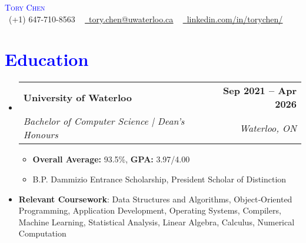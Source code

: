 \documentclass[letterpaper,11pt]{article}
\makeatletter
\newcommand{\resumeItem}[1]{
  \item\small{
    {#1 \vspace{-3pt}}
  }
}
\newcommand{\resumeSubheading}[4]{
  \vspace{-2pt}\item
    \begin{tabular*}{1.0\textwidth}[t]{l@{\extracolsep{\fill}}r}
      \textbf{#1} & \textbf{\small #2} \\
      \textit{\small#3} & \textit{\small #4} \\
    \end{tabular*}\vspace{-7pt}
}
\newcommand{\resumeSubItem}[1]{\resumeItem{#1}\vspace{-4pt}}
\newcommand{\resumeSubHeadingListStart}{\begin{itemize}[leftmargin=0.0in, label={}]}
\newcommand{\resumeSubHeadingListEnd}{\end{itemize}}
\makeatother
\begin{document}
\begin{center}
    \textcolor{Blue}{\Huge \scshape Tory Chen} \\ \vspace{1pt}
    \small \raisebox{-0.1\height}\faPhone\ (+1) 647-710-8563 ~ \href{mailto:tory.chen@uwaterloo.ca}{\raisebox{-0.2\height}\faEnvelope\  \underline{tory.chen@uwaterloo.ca}} ~ 
    \href{https://www.linkedin.com/in/torychen/}{\raisebox{-0.2\height}\faLinkedin\ \underline{linkedin.com/in/torychen/}}  ~
    \vspace{-8pt}
\end{center}


\section{\textcolor{Blue}{Education}}
  \resumeSubHeadingListStart
    \resumeSubheading
          {\textcolor{NavyBlue}{University of Waterloo}}{Sep 2021 -- Apr 2026}
      {Bachelor of Computer Science | Dean's Honours}{Waterloo, ON}
      \begin{itemize}
        \item\small \textbf{Overall Average:} 93.5\%, \textbf{GPA:} 3.97/4.00
        \item\small B.P. Dammizio Entrance Scholarship, President Scholar of Distinction
      \end{itemize}
  \resumeSubItem{}
    \textbf{\textcolor{NavyBlue}{Relevant Coursework}}{: Data Structures and Algorithms, Object‐Oriented Programming, Application Development, Operating Systems, Compilers, Machine Learning, Statistical Analysis, Linear Algebra, Calculus, Numerical Computation 
    } 
    \vspace{3pt}
  \resumeSubHeadingListEnd
\vspace{-22pt}
\end{document}
